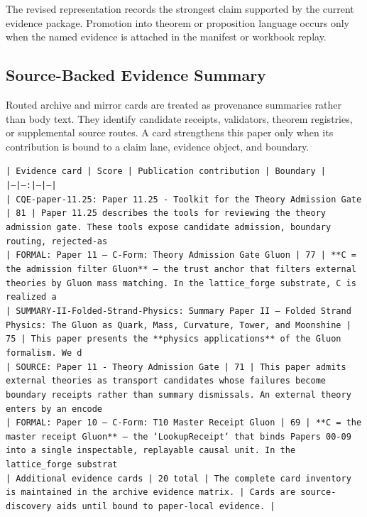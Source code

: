 \documentclass[11pt]{article}
\begin{document}
The revised representation records the strongest claim supported by the current evidence package. Promotion into theorem or proposition language occurs only when the named evidence is attached in the manifest or workbook replay.

\subsection*{Source-Backed Evidence Summary}

Routed archive and mirror cards are treated as provenance summaries rather than
body text. They identify candidate receipts, validators, theorem registries, or
supplemental source routes. A card strengthens this paper only when its
contribution is bound to a claim lane, evidence object, and boundary.

\noindent\texttt{| Evidence card | Score | Publication contribution | Boundary |}\\
\noindent\texttt{|---|---:|---|---|}\\
\noindent\texttt{| CQE-paper-11.25: Paper 11.25 - Toolkit for the Theory Admission Gate | 81 | Paper 11.25 describes the tools for reviewing the theory admission gate. These tools expose candidate admission, boundary routing, rejected-as}\\
\noindent\texttt{| FORMAL: Paper 11 — C-Form: Theory Admission Gate Gluon | 77 | **C = the admission filter Gluon** — the trust anchor that filters external theories by Gluon mass matching. In the lattice\_forge substrate, C is realized a}\\
\noindent\texttt{| SUMMARY-II-Folded-Strand-Physics: Summary Paper II — Folded Strand Physics: The Gluon as Quark, Mass, Curvature, Tower, and Moonshine | 75 | This paper presents the **physics applications** of the Gluon formalism. We d}\\
\noindent\texttt{| SOURCE: Paper 11 - Theory Admission Gate | 71 | This paper admits external theories as transport candidates whose failures become boundary receipts rather than summary dismissals. An external theory enters by an encode}\\
\noindent\texttt{| FORMAL: Paper 10 — C-Form: T10 Master Receipt Gluon | 69 | **C = the master receipt Gluon** — the `LookupReceipt` that binds Papers 00-09 into a single inspectable, replayable causal unit. In the lattice\_forge substrat}\\
\noindent\texttt{| Additional evidence cards | 20 total | The complete card inventory is maintained in the archive evidence matrix. | Cards are source-discovery aids until bound to paper-local evidence. |}\\
\end{document}
